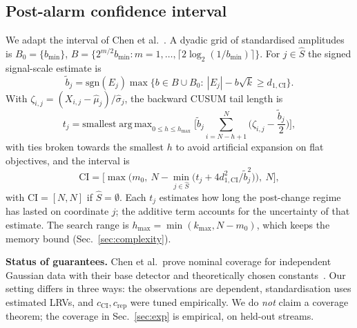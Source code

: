 \documentclass[conference]{IEEEtran}
\DeclareMathOperator*{\argmax}{arg\,max}
\begin{document}
\subsection{Post-alarm confidence interval}\label{sec:ci}
We adapt the interval of Chen et al.~\cite{chen2024}. A dyadic grid of standardised amplitudes is $B_0=\{b_{\min}\}$, $B=\{2^{m/2}b_{\min}:m=1,\dots,\lceil 2\log_2(1/b_{\min})\rceil\}$. For $j\in\hat S$ the signed signal-scale estimate is
\begin{equation}
\tilde b_j=\mathrm{sgn}(E_j)\max\{b\in B\cup B_0:\ |E_j|-b\sqrt{k}\ge d_{1,\mathrm{CI}}\}. \label{eq:btilde}
\end{equation}
With $\zeta_{i,j}=(X_{i,j}-\hat\mu_j)/\hat\sigma_j$, the backward CUSUM tail length is
\begin{equation}
t_j=\text{smallest}\argmax_{0\le h\le h_{\max}}\Big[\tilde b_j\sum_{i=N-h+1}^{N}\Big(\zeta_{i,j}-\frac{\tilde b_j}{2}\Big)\Big], \label{eq:tj}
\end{equation}
with ties broken towards the smallest $h$ to avoid artificial expansion on flat objectives, and the interval is
\begin{equation}
\mathrm{CI}=\Big[\max\Big(m_0,\ N-\min_{j\in\hat S}\big(t_j+4d^2_{1,\mathrm{CI}}/\tilde b_j^2\big)\Big),\ N\Big], \label{eq:CI}
\end{equation}
with $\mathrm{CI}=[N,N]$ if $\hat S=\emptyset$. Each $t_j$ estimates how long the post-change regime has lasted on coordinate $j$; the additive term accounts for the uncertainty of that estimate. The search range is $h_{\max}=\min(k_{\max},N-m_0)$, which keeps the memory bound (Sec.~\ref{sec:complexity}).

\textbf{Status of guarantees.} Chen et al.\ prove nominal coverage for independent Gaussian data with their base detector and theoretically chosen constants~\cite{chen2024}. Our setting differs in three ways: the observations are dependent, standardisation uses estimated LRVs, and $c_{\mathrm{CI}},c_{\mathrm{rep}}$ were tuned empirically. We do \emph{not} claim a coverage theorem; the coverage in Sec.~\ref{sec:exp} is empirical, on held-out streams.
\end{document}
